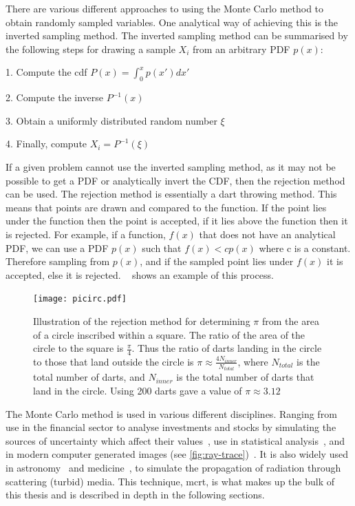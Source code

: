There are various different approaches to using the Monte Carlo method to obtain randomly sampled variables.
One analytical way of achieving this is the inverted sampling method.
The inverted sampling method can be summarised by the following steps for drawing a sample $X_i$ from an arbitrary PDF $p(x)$:

\medskip

1. Compute the \gls*{cdf} $P(x)=\int^{x}_{0}p(x')dx'$

2. Compute the inverse $P^{-1}(x)$

3. Obtain a uniformly distributed random number $\xi$

4. Finally, compute $X_i = P^{-1}(\xi)$

\medskip

If a given problem cannot use the inverted sampling method, as it may not be possible to get a PDF or analytically invert the CDF, then the rejection method can be used.
The rejection method is essentially a dart throwing method.
This means that points are drawn and compared to the function.
If the point lies under the function then the point is accepted, if it lies above the function then it is rejected.
For example, if a function, $f(x)$ that does not have an analytical PDF, we can use a PDF $p(x)$ such that $f(x) < cp(x)$ where c is a constant.
Therefore sampling from $p(x)$, and if the sampled point lies under $f(x)$ it is accepted, else it is rejected.
~ shows an example of this process.

\begin{figure}[!ht]
    \centering
    \texttt{[image: picirc.pdf]}
    \caption{Illustration of the rejection method for determining $\pi$ from the area of a circle inscribed within a square. The ratio of the area of the circle to the square is $\tfrac{\pi}{4}$. Thus the ratio of darts landing in the circle to those that land outside the circle is $\pi \approx \tfrac{4N_{inner}}{N_{total}}$, where $N_{total}$ is the total number of darts, and $N_{inner}$ is the total number of darts that land in the circle. Using 200 darts gave a value of $\pi \approx 3.12$}
    \label{fig:picircle}
\end{figure}


The Monte Carlo method is used in various different disciplines. Ranging from use in the financial sector to analyse investments and stocks by simulating the sources of uncertainty which affect their values~\cite{jackel2002monte,finaceprrof}, use in statistical analysis~\cite{wall2012practical}, and in modern computer generated images (see \cref{fig:ray-trace})~\cite{Kajiyarendering,Cookraytracing}. It is also widely used in astronomy~\cite{robitaille2011hyperion,harries2014torus} and medicine~\cite{valentine2011monte,campbell2015monte}, to simulate the propagation of radiation through scattering (turbid) media. This technique, \gls*{mcrt}, is what makes up the bulk of this thesis and is described in depth in the following sections.

